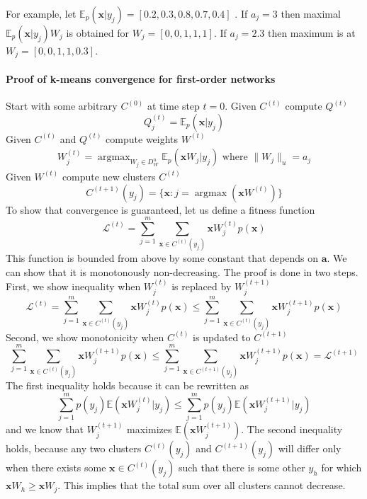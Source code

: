 \documentclass[12pt]{article}
\DeclareMathOperator*{\argmax}{argmax}
\begin{document}
For example, let 
$\mathbb{E}_{p}(\boldsymbol{x}|y_j) = [0.2,0.3,0.8,0.7,0.4]$ . If $a_j=3$ then maximal $\mathbb{E}_{p}(\boldsymbol{x}|y_j)W_j$ is obtained for 
$W_j=[0,0,1,1,1]$. If $a_j=2.3$ then maximum is at $W_j=[0,0,1,1,0.3]$.

\paragraph{Proof of k-means convergence for first-order networks}
Start with some arbitrary $C^{(0)}$ at time step $t=0$. Given $C^{(t)}$ compute $Q^{(t)}$
\[
Q^{(t)}_j = \mathbb{E}_p(\boldsymbol{x}|y_j)
\]
Given $C^{(t)}$ and $Q^{(t)}$ compute weights $W^{(t)}$
\begin{gather*}
	W_j^{(t)} = \argmax_{W_j\in D_W^{n}} \mathbb{E}_p(\boldsymbol{x}W_j|y_j)\text{ where } \lVert W_j \rVert_u=a_j
\end{gather*}
Given $W^{(t)}$ compute new clusters $C^{(t)}$
\[
C^{(t+1)}(y_j) = \{\boldsymbol{x} : j=\argmax(\boldsymbol{x}W^{(t)})\}
\]
To show that convergence is guaranteed, let us define a fitness function
\[
\mathcal{L}^{(t)} = \sum_{j=1}^m \sum_{\boldsymbol{x}\in C^{(t)}(y_j)} \boldsymbol{x} W_j^{(t)} p(\boldsymbol{x})
\] 
This function is bounded from above by some constant that depends on $\boldsymbol{a}$. We can show that it is monotonously non-decreasing. The proof is done in two steps. First, we show inequality when $W_j^{(t)}$  is replaced by $W_j^{(t+1)}$
\[\mathcal{L}^{(t)}= \sum_{j=1}^m \sum_{\boldsymbol{x}\in C^{(t)}(y_j)} \boldsymbol{x} W_j^{(t)} p(\boldsymbol{x}) \le \sum_{j=1}^m \sum_{\boldsymbol{x}\in C^{(t)}(y_j)} \boldsymbol{x}W_j^{(t+1)} p(\boldsymbol{x})\] 
Second, we show monotonicity when $C^{(t)}$ is updated to $C^{(t+1)}$
\[\sum_{j=1}^m \sum_{\boldsymbol{x}\in C^{(t)}(y_j)} \boldsymbol{x} W_j^{(t+1)} p(\boldsymbol{x}) \le \sum_{j=1}^m \sum_{\boldsymbol{x}\in C^{(t+1)}(y_j)} \boldsymbol{x} W_j^{(t+1)} p(\boldsymbol{x})=\mathcal{L}^{(t+1)}\] 
The first inequality holds because it can be rewritten as
\[\sum_{j=1}^m p(y_j) \mathbb{E}(\boldsymbol{x} W_j^{(t)}|y_j)  \le \sum_{j=1}^m  p(y_j)  \mathbb{E}(\boldsymbol{x}W_j^{(t+1)}|y_j)\] 
and we know that $W_j^{(t+1)}$ maximizes $\mathbb{E}(\boldsymbol{x}W_j^{(t+1)})$.
The second inequality holds, because any two clusters $C^{(t)}(y_j)$ and  $C^{(t+1)}(y_j)$ will differ only when there exists some $\boldsymbol{x}\in C^{(t)}(y_j)$ such that there is some other $y_h$ for which $\boldsymbol{x}W_h \ge \boldsymbol{x} W_j$. This implies that the total sum over all clusters cannot decrease.
\end{document}
